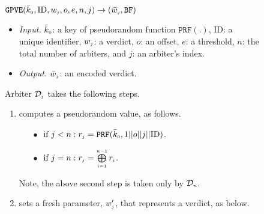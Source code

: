 \begin{figure}[!htbp]
\setlength{\fboxsep}{1pt}
\begin{center}
    \begin{tcolorbox}[enhanced,width=5.5in,
    drop fuzzy shadow southwest,
    colframe=black,colback=white]
    \small{
    \vspace{-1.3mm}

\underline{$\mathtt{GPVE}(\bar{k}_{\scriptscriptstyle 0}, \text{ID},  w_{\scriptscriptstyle j}, o, e, n,  j)\rightarrow  (\bar{  w}_{\scriptscriptstyle j}, \mathtt{BF})$}\\
%
\begin{itemize}
\item \noindent\textit{Input.} $\bar{k}_{\scriptscriptstyle 0}$: a key of  pseudorandom function $\mathtt{PRF}(.)$, $\text{ID}$: a unique identifier, $ w_{\scriptscriptstyle j}$: a  verdict, $o$: an offset, $e$: a threshold, $n$: the total number of  arbiters,  and  $j$: an arbiter's index.
%
\item \noindent\textit{Output.} $\bar{  w}_{\scriptscriptstyle j}$:  an  encoded verdict.  
%
\end{itemize}
Arbiter $\mathcal{D}_{\scriptscriptstyle j}$ takes the following steps.
\begin{enumerate}
%
\item\label{ZSPA:val-gen} computes a  pseudorandom  value,  as follows. 
%
%
\begin{itemize}
%
\item[$\bullet$]$ \text{ if } j< n: r_{\scriptscriptstyle j}=\mathtt{PRF}(\bar k_{\scriptscriptstyle 0}, 1||o||j||\text{ID})$.\\
%
\item [$\bullet$] $ \text{ if } j=n: r_{\scriptscriptstyle j}= \bigoplus\limits^{\scriptscriptstyle n-1}_{\scriptscriptstyle i=1} r_{\scriptscriptstyle i}$.
%
\end{itemize}
Note, the above second step is taken only by $\mathcal{D}_{\scriptscriptstyle n}$.
%
\item  sets a fresh parameter, $w'_{\scriptscriptstyle j}$, that represents a verdict, as below. 
%


\end{enumerate}}
\end{tcolorbox}
\end{center}
\end{figure}
